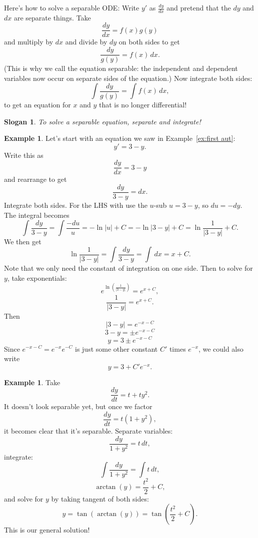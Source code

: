\documentclass[12pt]{amsart}
\numberwithin{equation}{section}
\theoremstyle{plain} %
\newtheorem{slogan}[equation]{Slogan}
\theoremstyle{definition}
\newtheorem{ex}[equation]{Example}
\theoremstyle{remark}
\begin{document}
Here's how to solve a separable ODE: Write $y'$ as $\frac{dy}{dx}$ and pretend that the $dy$ and $dx$ are separate things. Take
\[ \frac{dy}{dx} = f(x)g(y)\]
and multiply by $dx$ and divide by $dy$ on both sides to get
\[ \frac{dy}{g(y)} = f(x) \, dx.\]
(This is why we call the equation separable: the independent and dependent variables now occur on separate sides of the equation.) Now integrate both sides:
\[ \int \frac{dy}{g(y)} = \int f(x) \, dx,\]
to get an equation for $x$ and $y$ that is no longer differential!

\begin{slogan} To solve a separable equation, separate and integrate!\end{slogan}

\begin{ex} Let's start with an equation we saw in Example~\ref{ex:first aut}:
\[ y' = 3-y.\]
Write this as 
\[ \frac{dy}{dx} = 3-y\]
and rearrange to get
\[ \frac{dy}{3-y} = dx.\]
Integrate both sides. For the LHS with use the $u$-sub $u=3-y$, so $du = - dy$. The integral becomes
\[ \int  \frac{dy}{3-y} = \int \frac{-du}{u} = -\ln|u| +C = -\ln|3-y|+C = \ln\frac{1}{|3-y|} +C.\]
We then get 
\[ \ln\frac{1}{|3-y|}  = \int  \frac{dy}{3-y} =\int \,dx = x + C.\]
Note that we only need the constant of integration on one side.
Then to solve for $y$, take exponentials:
\[ e^{\ln(\frac{1}{|3-y|})} = e^{x+C},\]
\[ \frac{1}{|3-y|} = e^{x+C}.\]
Then 
\[ |3-y| ={e^{-x-C}}\]
\[ 3-y =  \pm {e^{-x-C}}\]
\[ y =  3 \pm {e^{-x-C}}\]
Since $e^{-x-C}=e^{-x} e^{-C}$ is just some other constant $C'$ times $e^{-x}$, we could also write
\[ y= 3 + C' e^{-x}.\]
\end{ex}

\begin{ex} Take
\[ \frac{dy}{dt} = t + ty^2.\]
It doesn't look separable yet, but once we factor
\[ \frac{dy}{dt} = t (1 +y^2),\]
it becomes clear that it's separable. Separate variables:
\[ \frac{dy}{1+y^2} = t \, dt,\]
integrate:
\[ \int \frac{dy}{1+y^2} = \int t \, dt,\]
\[ \arctan(y) = \frac{t^2}{2} + C,\]
and solve for $y$ by taking tangent of both sides:
\[ y=\tan(\arctan(y)) = \tan\left(  \frac{t^2}{2} + C\right).\]
This is our general solution!
\end{ex}
\end{document}
